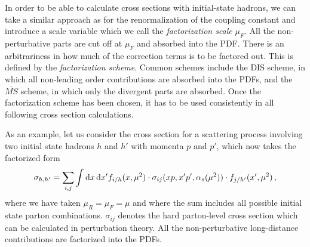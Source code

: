 In order to be able to calculate cross sections with initial-state hadrons, we can take a similar approach as for the renormalization of the coupling constant and introduce a scale variable which we call the \textit{factorization scale} $\mu_F$.
All the non-perturbative parts are cut off at $\mu_F$ and absorbed into the PDF.
There is an arbitrariness in how much of the correction terms is to be factored out.
This is defined by the \textit{factorization scheme}.
Common schemes include the DIS scheme, in which all non-leading order contributions are absorbed into the PDFs, and the $\overline{MS}$ scheme, in which only the divergent parts are absorbed.
Once the factorization scheme has been chosen, it has to be used consistently in all following cross section calculations.

As an example, let us consider the cross section for a scattering process involving two initial state hadrons $h$ and $h'$ with momenta $p$ and $p'$, which now takes the factorized form
%
\begin{equation}
	\sigma_{h,h'} = \sum_{i,j} \int \dif x \dif x' f_{i/h}(x,\mu^2) \cdot \sigma_{ij}(x p,x' p',\alpha_s(\mu^2)) \cdot f_{j/h'}(x',\mu^2) \, ,
\end{equation}
%
where we have taken $\mu_R = \mu_F= \mu$ and where the sum includes all possible initial state parton combinations.
$\sigma_{ij}$ denotes the hard parton-level cross section which can be calculated in perturbation theory.
All the non-perturbative long-distance contributions are factorized into the PDFs.
%

